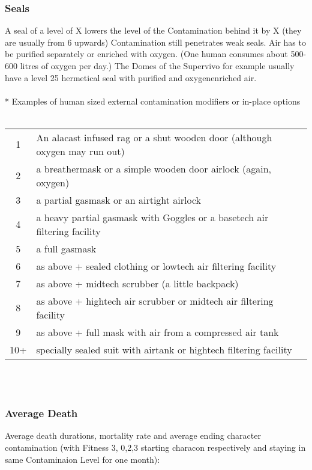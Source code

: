 \documentclass{article}
\begin{document}
    \subsubsection{Seals}
    A seal of a level of X lowers the level of the Contamination behind it by X (they are usually from 6 upwards)
    Contamination still penetrates weak seals. Air has to be purified separately or enriched with oxygen.
    (One human consumes about 500-600 litres of oxygen per day.) The Domes of the Supervivo for
    example usually have a level 25 hermetical seal with purified and oxygenenriched air.\\\\*
    Examples of human sized external contamination modifiers or in-place options\\\\
    \begin{tabular}{cl}
        1& An alacast infused rag or a shut wooden door (although oxygen may run out)\\
        2& a breathermask or a simple wooden door airlock (again, oxygen)\\
        3& a partial gasmask  or an airtight airlock\\
        4& a heavy partial gasmask with Goggles or a basetech air filtering facility\\
        5& a full gasmask\\
        6& as above + sealed clothing or lowtech air filtering facility\\
        7& as above + midtech scrubber (a little backpack)\\
        8& as above + hightech air scrubber or midtech air filtering facility\\
        9& as above + full mask with air from a compressed air tank\\
       10+& specially sealed suit with airtank or hightech filtering facility\\
    \end{tabular}\\\pagebreak\\

    \subsubsection{Average Death}
    Average death durations, mortality rate and average ending character contamination
    (with Fitness 3, 0,2,3 starting characon respectively and staying in same Contaminaion Level for one month):\\\\
\end{document}
